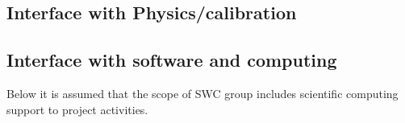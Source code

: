 

\subsection{Interface with Physics/calibration}
\label{sec:fdsp-slow-cryo-slow-phys/calib}




\subsection{Interface with software and computing}
\label{sec:fdsp-slow-cryo-slow-soft/comp}

 Below it is assumed that the scope of SWC group includes scientific computing support to project activities.

